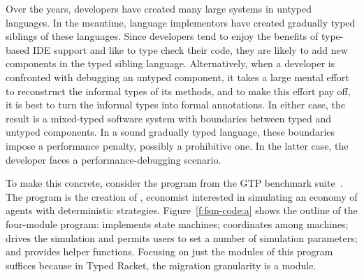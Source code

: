 
Over the years, developers have created many large systems in untyped languages.
In the meantime, language implementors have created gradually typed siblings of
these languages.  Since developers tend to enjoy the benefits of type-based IDE
support and like to type check their code, they are likely to add new components
in the typed sibling language. Alternatively, when a developer is confronted
with debugging an untyped component, it takes a large mental effort to
reconstruct the informal types of its methods, and to make this effort pay off,
it is best to turn the informal types into formal annotations. In either case,
the result is a mixed-typed software system with boundaries between typed and
untyped components. In a sound gradually typed language, these boundaries impose
a performance penalty, possibly a prohibitive one. In the latter case, the
developer faces a performance-debugging scenario.


To make this concrete, consider the  program from the GTP benchmark
suite~\cite{gtp-benchmarks}. The program is the creation of \citet{fsm},
economist interested in simulating an economy of agents with deterministic
strategies. Figure~\ref{f:fsm-code:a} shows the outline of the four-module
program:  implements state machines;  coordinates among
machines;  drives the simulation and permits users to set a number of
simulation parameters; and  provides helper functions.  Focusing on
just the modules of this program suffices because in Typed Racket, the migration
granularity is a module.

